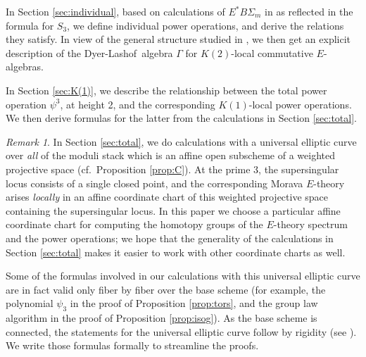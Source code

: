 \documentclass{gtpart}
\theoremstyle{definition}
\theoremstyle{remark}
\newtheorem{rmk}[thm]{Remark}
\newcommand{\DL}{Dyer-Lashof~}
\newcommand{\G}{\Gamma}
\newcommand{\p}{\psi^3}
\begin{document}
In Section \ref{sec:individual}, based on calculations of 
$E^* B\Sigma_m$ in \cite{Str98} as reflected in the formula for $S_3$, 
we define individual power operations, and derive the relations they 
satisfy.  In view of the general structure studied in \cite{cong}, we 
then get an explicit description of the \DL algebra $\G$ for 
$K(2)$-local commutative $E$-algebras.  

In Section \ref{sec:K(1)}, we describe the relationship between the 
total power operation $\p$, at height 2, and the corresponding 
$K(1)$-local power operations.  We then derive formulas for the latter 
from the calculations in Section \ref{sec:total}.  

\begin{rmk}
\label{rmk:grading}
 In Section \ref{sec:total}, we do calculations with a universal 
 elliptic curve over {\em all} of the moduli stack which is an affine 
 open subscheme of a weighted projective space (cf.~Proposition 
 \ref{prop:C}).  At the prime 3, the supersingular locus consists of a 
 single closed point, and the corresponding Morava $E$-theory arises 
 {\em locally} in an affine coordinate chart of this weighted projective 
 space containing the supersingular locus.  In this paper we choose a 
 particular affine coordinate chart for computing the homotopy groups of 
 the $E$-theory spectrum and the power operations; we hope that the 
 generality of the calculations in Section \ref{sec:total} makes it 
 easier to work with other coordinate charts as well.  

 Some of the formulas involved in our calculations with this universal 
 elliptic curve are in fact valid only fiber by fiber over the base 
 scheme (for example, the polynomial $\psi_3$ in the proof of 
 Proposition \ref{prop:tors}, and the group law algorithm in the proof 
 of Proposition \ref{prop:isog}).  As the base scheme is connected, the 
 statements for the universal elliptic curve follow by rigidity (see 
 \cite[Section 2.4]{KM}).  We write those formulas formally to 
 streamline the proofs.  
\end{rmk}
\end{document}
